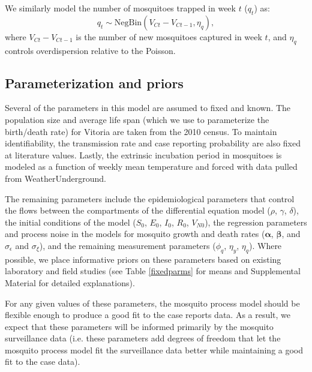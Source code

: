 \documentclass[10pt,letterpaper]{article}
\begin{document}
We similarly model the number of mosquitoes trapped in week $t$ ($q_t$) as:
\begin{equation}
q_t \sim \text{NegBin}(V_{Ct} - V_{Ct-1}, \eta_q),
\end{equation}
where $V_{Ct} - V_{Ct-1}$ is the number of new mosquitoes captured in week $t$, and $\eta_q$ controls overdispersion relative to the Poisson.

\subsection*{Parameterization and priors}

Several of the parameters in this model are assumed to fixed and known. 
The population size and average life span (which we use to parameterize the birth/death rate) for Vitoria are taken from the 2010 census.
To maintain identifiability, the transmission rate and case reporting probability are also fixed at literature values.
Lastly, the extrinsic incubation period in mosquitoes is modeled as a function of weekly mean temperature and forced with data pulled from WeatherUnderground.

The remaining parameters include the epidemiological parameters that control the flows between the compartments of the differential equation model ($\rho$, $\gamma$, $\delta$), the initial conditions of the model ($S_0$, $E_0$, $I_0$, $R_0$, $V_{N0}$), the regression parameters and process noise in the models for mosquito growth and death rates ($\mathbf{\alpha}$, $\mathbf{\beta}$, and $\sigma_{\epsilon}$ and $\sigma_{\xi}$), and the remaining measurement parameters ($\phi_q$, $\eta_y$, $\eta_q$).  
Where possible, we place informative priors on these parameters based on existing laboratory and field studies (see Table \ref{fixedparms} for means and Supplemental Material for detailed explanations).

For any given values of these parameters, the mosquito process model should be flexible enough to produce a good fit to the case reports data.
As a result, we expect that these parameters will be informed primarily by the mosquito surveillance data (i.e. these parameters add degrees of freedom that let the mosquito process model fit the surveillance data better while maintaining a good fit to the case data).
\end{document}
